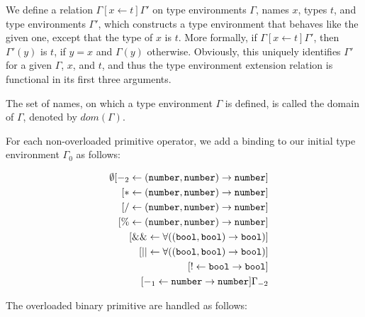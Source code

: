 We define a relation $\Gamma[x \leftarrow t]\Gamma'$ on type environments 
$\Gamma$, names $x$, types $t$, and type environments $\Gamma'$,
which constructs a type environment that behaves like the 
given one, except that the type of $x$ is $t$. More formally, 
if $\Gamma[x \leftarrow t]\Gamma'$, then $\Gamma'(y)$ is $t$, 
if $y=x$ and $\Gamma(y)$ 
otherwise. Obviously, this uniquely identifies $\Gamma'$ for
a given $\Gamma$, $x$, and $t$, and thus the type environment extension
relation is functional in its first three arguments.

The set of names, on which a type environment
$\Gamma$ is defined, is called the domain of $\Gamma$, 
denoted by $\textit{dom}(\Gamma)$.


For each non-overloaded primitive operator, we add a binding to our initial
type environment $\Gamma_0$ as follows:

\begin{eqnarray*}
& &
       \emptyset[ -_2 \leftarrow  (\texttt{number}, \texttt{number}) \rightarrow \texttt{number}]\\
&& \hspace{2mm} [ * \leftarrow  (\texttt{number}, \texttt{number}) \rightarrow \texttt{number}]\\
&& \hspace{2mm} [ / \leftarrow  (\texttt{number}, \texttt{number}) \rightarrow \texttt{number}]\\
&& \hspace{2mm} [ \% \leftarrow (\texttt{number}, \texttt{number}) \rightarrow \texttt{number}]\\
&& \hspace{2mm} [ \&\& \leftarrow \forall((\texttt{bool}, \texttt{bool}) \rightarrow \texttt{bool})]\\
&& \hspace{2mm} [ || \leftarrow   \forall((\texttt{bool}, \texttt{bool}) \rightarrow \texttt{bool})]\\
&& \hspace{2mm} [ ! \leftarrow \texttt{bool} \rightarrow \texttt{bool}]\\
&& \hspace{2mm} [ -_1 \leftarrow \texttt{number} \rightarrow \texttt{number}]\Gamma_{-2}
\end{eqnarray*}

The overloaded binary primitive are handled as follows:


